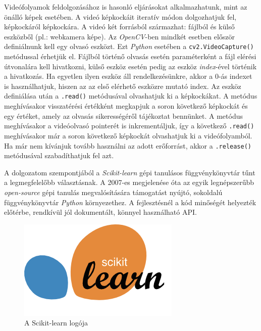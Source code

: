 Videófolyamok feldolgozásához is hasonló eljárásokat alkalmazhatunk, mint az önálló képek esetében. A videó képkockáit iteratív módon dolgozhatjuk fel, képkockáról képkockára. A videó két forrásból származhat: fájlból és külső eszközből (pl.: webkamera képe). Az \textit{OpenCV}-ben mindkét esetben először definiálnunk kell egy olvasó eszközt. Ezt \textit{Python} esetében a \texttt{cv2.VideoCapture()} metódussal érhetjük el. Fájlból történő olvasás esetén paraméterként a fájl elérési útvonalára kell hivatkozni, külső eszköz esetén pedig az eszköz \textit{index}-ével történik a hivatkozás. Ha egyetlen ilyen eszköz áll rendelkezésünkre, akkor a 0-ás indexet is használhatjuk, hiszen az az első elérhető eszközre mutató index.
Az eszköz definiálása után a \texttt{.read()} metódusával olvashatjuk ki a képkockákat. A metódus meghívásakor visszatérési értékként megkapjuk a soron következő képkockát és egy értéket, amely az olvasás sikerességéről tájékoztat bennünket. A metódus meghívásakor a videóolvasó pointerét is inkrementáljuk, így a következő \texttt{.read()} meghívásakor már a soron következő képkockát olvashatjuk ki a videófolyamból. Ha már nem kívánjuk tovább használni az adott erőforrást, akkor a \texttt{.release()} metódusával szabadíthatjuk fel azt.


A dolgozatom szempontjából a \textit{Scikit-learn} gépi tanulásos függvénykönyvtár tűnt a legmegfelelőbb választásnak. A 2007-es megjelenése óta az egyik legnépszerűbb \textit{open-source} gépi tanulás megvalósítására támogatást nyújtó, sokoldalú függvénykönyvtár \textit{Python} környezethez. A fejlesztésnél a kód minőségét helyezték előtérbe, rendkívül jól dokumentált, könnyel használható API.

\begin{figure}[h]
\centering
\includegraphics[width=4.76truecm, height=2.96truecm]{images/scikit-learn-logo.png}
\caption{A Scikit-learn logója}
\label{fig:scikit}
\end{figure}

